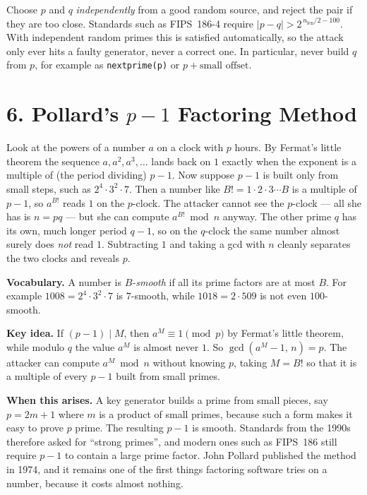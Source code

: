 \documentclass[11pt]{article}
\begin{document}
\begin{fixbox}
Choose $p$ and $q$ \emph{independently} from a good random source, and reject the pair if they are too close. Standards such as FIPS~186-4 require $|p-q|>2^{\,n_{\text{len}}/2-100}$. With independent random primes this is satisfied automatically, so the attack only ever hits a faulty generator, never a correct one. In particular, never build $q$ from $p$, for example as \texttt{nextprime(p)} or $p+\text{small offset}$.
\end{fixbox}

\hrulefill

\section*{6. Pollard's $p-1$ Factoring Method}

\begin{intuition}
Look at the powers of a number $a$ on a clock with $p$ hours. By Fermat's little theorem the sequence $a,a^2,a^3,\dots$ lands back on $1$ exactly when the exponent is a multiple of (the period dividing) $p-1$. Now suppose $p-1$ is built only from small steps, such as $2^4\cdot3^2\cdot7$. Then a number like $B!=1\cdot2\cdot3\cdots B$ is a multiple of $p-1$, so $a^{B!}$ reads $1$ on the $p$-clock. The attacker cannot see the $p$-clock --- all she has is $n=pq$ --- but she can compute $a^{B!}\bmod n$ anyway. The other prime $q$ has its own, much longer period $q-1$, so on the $q$-clock the same number almost surely does \emph{not} read $1$. Subtracting $1$ and taking a gcd with $n$ cleanly separates the two clocks and reveals $p$.
\end{intuition}

\textbf{Vocabulary.} A number is \emph{$B$-smooth} if all its prime factors are at most $B$. For example $1008=2^4\cdot3^2\cdot7$ is $7$-smooth, while $1018=2\cdot509$ is not even $100$-smooth.

\textbf{Key idea.} If $(p-1)\mid M$, then $a^M\equiv1\pmod p$ by Fermat's little theorem, while modulo $q$ the value $a^M$ is almost never $1$. So $\gcd(a^M-1,\,n)=p$. The attacker can compute $a^M\bmod n$ without knowing $p$, taking $M=B!$ so that it is a multiple of every $p-1$ built from small primes.

\textbf{When this arises.} A key generator builds a prime from small pieces, say $p=2m+1$ where $m$ is a product of small primes, because such a form makes it easy to prove $p$ prime. The resulting $p-1$ is smooth. Standards from the 1990s therefore asked for ``strong primes'', and modern ones such as FIPS~186 still require $p-1$ to contain a large prime factor. John Pollard published the method in 1974, and it remains one of the first things factoring software tries on a number, because it costs almost nothing.
\end{document}
